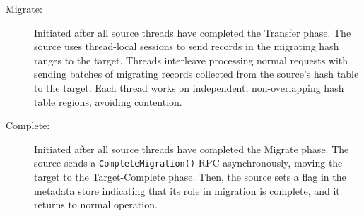 \begin{description}
\item[Migrate:]
Initiated after all source threads have completed the Transfer phase.
%
The source uses thread-local sessions to send records in the migrating hash ranges
to the target.
%
Threads interleave processing normal requests with sending batches of migrating
records collected from the source's hash table to the target.
%
Each thread works on independent, non-overlapping hash table regions, avoiding
contention.

\item[Complete:]
Initiated after all source threads have completed the Migrate phase.
%
The source sends a \texttt{CompleteMigration()} RPC asynchronously, moving the target to the Target-Complete phase.
%
Then,
%
the source sets a flag in the metadata store
indicating that its role in migration is complete, and it returns to
normal operation.

\end{description}

